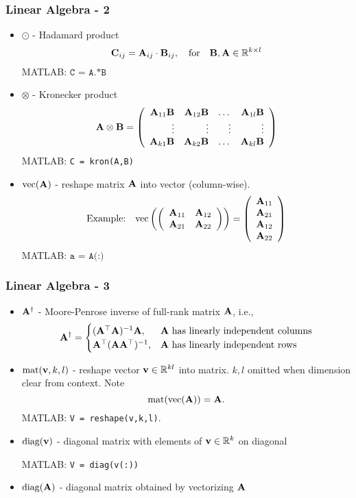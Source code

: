 \documentclass[12pt,fleqn]{beamer}
\begin{document}
\begin{frame}
	\frametitle{Linear Algebra - 2}
	\begin{itemize}
		\item $\odot$ - Hadamard product
		$$
			{\bf C}_{ij} = {\bf A}_{ij} \cdot {\bf B}_{ij}, \quad \text{for} \quad {\bf B},{\bf A} \in \mathbb{R}^{k\times l}
		$$
		MATLAB: $\texttt{C = A.*B}$
		\item $\otimes$ - Kronecker product
		$$
			{\bf A} \otimes {\bf B} = \left(
				\begin{array}{rrrrr}
					{\bf A}_{11} {\bf B} & {\bf A}_{12} {\bf B} & \dots & {\bf A}_{1l} {\bf B} \\
					\vdots         & \vdots         & \vdots& \vdots\\
					{\bf A}_{k1} {\bf B} & {\bf A}_{k2} {\bf B} & \dots & {\bf A}_{kl} {\bf B} \\
				\end{array}
			\right)
		$$
		MATLAB: \texttt{C = kron(A,B)}
		\item ${\rm vec}({\bf A})$ - reshape matrix ${\bf A}$ into vector (column-wise). 
		$$
		\text{Example:}\quad
			{\rm vec}\left(
				\left(
					\begin{array}{rr}
						{\bf A}_{11} & {\bf A}_{12} \\
						{\bf A}_{21} & {\bf A}_{22} 
					\end{array}
				\right)
			\right) = \left( 
				\begin{array}{r}
					{\bf A}_{11}\\
					{\bf A}_{21} \\
					{\bf A}_{12}\\
					{\bf A}_{22}
				\end{array}
			\right)
		$$
		MATLAB: $\texttt{a = A(:)}$
	\end{itemize}
\end{frame}


\begin{frame}
	\frametitle{Linear Algebra - 3}
	\begin{itemize}
		\item ${\bf A}^{\dag}$ - Moore-Penrose inverse of full-rank matrix ${\bf A}$, i.e., 
		$$
			{\bf A}^{\dag} = \begin{cases}
				({\bf A}^{\top} {\bf A})^{-1}{\bf A}, & {\bf A} \text{ has linearly independent columns}\\
				{\bf A}^\top ({\bf A} {\bf A}^\top)^{-1}, & {\bf A} \text{ has linearly independent rows}\\				
			\end{cases}
		$$
		\item ${\rm mat}({\bf v},k,l)$ - reshape vector ${\bf v}\in\mathbb{R}^{kl}$ into matrix. $k,l$ omitted when dimension clear from context. Note
		$$
			{\rm mat}({\rm vec} ({\bf A})) = {\bf A}.
		$$
		MATLAB: \texttt{V = reshape(v,k,l)}.
	
		\item ${\rm diag}({\bf v})$ - diagonal matrix with elements of ${\bf v} \in \mathbb{R}^k$ on diagonal
		
		MATLAB: \texttt{V = diag(v(:))}
		
		\item ${\rm diag}({\bf A})$ - diagonal matrix obtained by vectorizing ${\bf A}$
	\end{itemize}
\end{frame}
\end{document}
